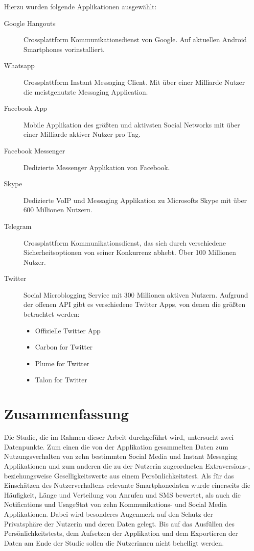 Hierzu wurden folgende Applikationen ausgewählt:
\begin{description}
  \item [Google Hangouts] Crossplattform Kommunikationsdienst von Google. Auf aktuellen Android Smartphones vorinstalliert.
  \item [Whatsapp] Crossplattform Instant Messaging Client. Mit über einer Milliarde Nutzer die meistgenutzte Messaging Application\cite{whatsappuser}.
  \item [Facebook App] Mobile Applikation des größten und aktivsten Social Networks mit über einer Milliarde aktiver Nutzer pro Tag\cite{facebookuser}.
  \item [Facebook Messenger] Dedizierte Messenger Applikation von Facebook.
  \item [Skype] Dedizierte VoIP und Messaging Applikation zu Microsofts Skype mit über 600 Millionen Nutzern\cite{skypeuser}.
  \item [Telegram] Crossplattform Kommunikationsdienst, das sich durch verschiedene Sicherheitsoptionen von seiner Konkurrenz abhebt. Über 100 Millionen Nutzer\cite{telegramuser}.
  \item [Twitter] Social Microblogging Service mit 300 Millionen aktiven Nutzern. Aufgrund der offenen API gibt es verschiedene Twitter Apps, von denen die größten betrachtet werden:
  \begin{itemize}
      \item Offizielle Twitter App
      \item Carbon for Twitter
      \item Plume for Twitter
      \item Talon for Twitter
  \end{itemize}
\end{description}




\section{Zusammenfassung}
\label{ch:Entwurf:sec:zusammenfassung}

Die Studie, die im Rahmen dieser Arbeit durchgeführt wird, untersucht zwei Datenpunkte.
Zum einen die von der Applikation gesammelten Daten zum Nutzungsverhalten von zehn bestimmten Social Media und Instant Messaging Applikationen
und zum anderen die zu der Nutzerin zugeordneten Extraversions-, beziehungsweise Geselligkeitswerte aus einem Persönlichkeitstest.
Als für das Einschätzen des Nutzerverhaltens relevante Smartphonedaten wurde einerseits die Häufigkeit, Länge und Verteilung von  Anrufen und SMS bewertet,
als auch die Notifications und UsageStat von zehn Kommunikations- und Social Media Applikationen.
Dabei wird besonderes Augenmerk auf den Schutz der Privatsphäre der Nutzerin und deren Daten gelegt.
Bis auf das Ausfüllen des Persönlichkeitstests, dem Aufsetzen der Applikation und dem Exportieren der Daten am Ende der Studie sollen die Nutzerinnen nicht behelligt werden.



